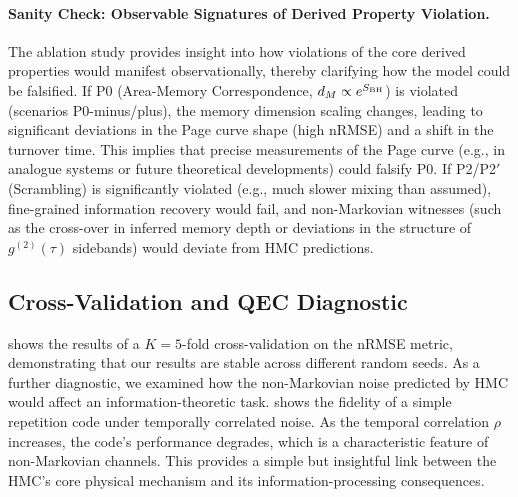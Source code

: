 \documentclass[a4paper,11pt]{article}
\newcommand{\eg}{e.g.\xspace}
\newcommand{\HMC}{\textup{\textsc{HMC}}\xspace}
\theoremstyle{plain}
\theoremstyle{definition}
\theoremstyle{remark}
\newcommand{\datatableAblationSig}{}
\begin{document}
\begin{table}[htbp]
\centering
\caption{Significance testing for the ablation study, comparing each scenario to the nominal case. We report Welch's t-statistic, p-value, FDR-corrected q-value, and Cohen's $d$ effect size.}
\label{tab:ablation_stats}
\vspace{0.5em}
\footnotesize
\setlength{\tabcolsep}{4pt}
\pgfplotstabletypeset{\datatableAblationSig}
\vspace{0.5em}
\end{table}

\paragraph{Sanity Check: Observable Signatures of Derived Property Violation.}
The ablation study provides insight into how violations of the core derived properties would manifest observationally, thereby clarifying how the model could be falsified. If P0 (Area-Memory Correspondence, $d_M \propto e^{S_{\rm BH}}$) is violated (scenarios P0-minus/plus), the memory dimension scaling changes, leading to significant deviations in the Page curve shape (high nRMSE) and a shift in the turnover time. This implies that precise measurements of the Page curve (\eg, in analogue systems or future theoretical developments) could falsify P0. If P2/P2$'$ (Scrambling) is significantly violated (\eg, much slower mixing than assumed), fine-grained information recovery would fail, and non-Markovian witnesses (such as the cross-over in inferred memory depth or deviations in the structure of $g^{(2)}(\tau)$ sidebands) would deviate from \HMC{} predictions.

\subsection{Cross-Validation and QEC Diagnostic}
 shows the results of a $K=5$-fold cross-validation on the nRMSE metric, demonstrating that our results are stable across different random seeds. As a further diagnostic, we examined how the non-Markovian noise predicted by \HMC{} would affect an information-theoretic task.  shows the fidelity of a simple repetition code under temporally correlated noise. As the temporal correlation $\rho$ increases, the code's performance degrades, which is a characteristic feature of non-Markovian channels. This provides a simple but insightful link between the \HMC{}'s core physical mechanism and its information-processing consequences.
\end{document}
